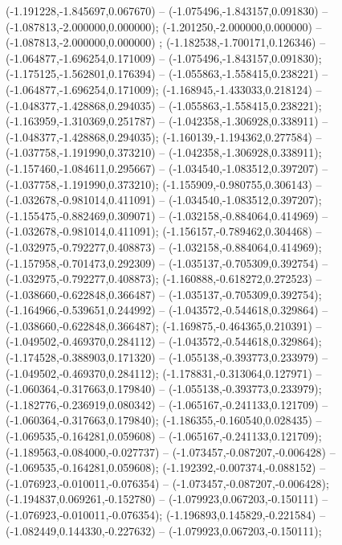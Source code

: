  (-1.191228,-1.845697,0.067670) -- (-1.075496,-1.843157,0.091830) -- (-1.087813,-2.000000,0.000000);
 (-1.201250,-2.000000,0.000000) -- (-1.087813,-2.000000,0.000000) ;
 (-1.182538,-1.700171,0.126346) -- (-1.064877,-1.696254,0.171009) -- (-1.075496,-1.843157,0.091830);
 (-1.175125,-1.562801,0.176394) -- (-1.055863,-1.558415,0.238221) -- (-1.064877,-1.696254,0.171009);
 (-1.168945,-1.433033,0.218124) -- (-1.048377,-1.428868,0.294035) -- (-1.055863,-1.558415,0.238221);
 (-1.163959,-1.310369,0.251787) -- (-1.042358,-1.306928,0.338911) -- (-1.048377,-1.428868,0.294035);
 (-1.160139,-1.194362,0.277584) -- (-1.037758,-1.191990,0.373210) -- (-1.042358,-1.306928,0.338911);
 (-1.157460,-1.084611,0.295667) -- (-1.034540,-1.083512,0.397207) -- (-1.037758,-1.191990,0.373210);
 (-1.155909,-0.980755,0.306143) -- (-1.032678,-0.981014,0.411091) -- (-1.034540,-1.083512,0.397207);
 (-1.155475,-0.882469,0.309071) -- (-1.032158,-0.884064,0.414969) -- (-1.032678,-0.981014,0.411091);
 (-1.156157,-0.789462,0.304468) -- (-1.032975,-0.792277,0.408873) -- (-1.032158,-0.884064,0.414969);
 (-1.157958,-0.701473,0.292309) -- (-1.035137,-0.705309,0.392754) -- (-1.032975,-0.792277,0.408873);
 (-1.160888,-0.618272,0.272523) -- (-1.038660,-0.622848,0.366487) -- (-1.035137,-0.705309,0.392754);
 (-1.164966,-0.539651,0.244992) -- (-1.043572,-0.544618,0.329864) -- (-1.038660,-0.622848,0.366487);
 (-1.169875,-0.464365,0.210391) -- (-1.049502,-0.469370,0.284112) -- (-1.043572,-0.544618,0.329864);
 (-1.174528,-0.388903,0.171320) -- (-1.055138,-0.393773,0.233979) -- (-1.049502,-0.469370,0.284112);
 (-1.178831,-0.313064,0.127971) -- (-1.060364,-0.317663,0.179840) -- (-1.055138,-0.393773,0.233979);
 (-1.182776,-0.236919,0.080342) -- (-1.065167,-0.241133,0.121709) -- (-1.060364,-0.317663,0.179840);
 (-1.186355,-0.160540,0.028435) -- (-1.069535,-0.164281,0.059608) -- (-1.065167,-0.241133,0.121709);
 (-1.189563,-0.084000,-0.027737) -- (-1.073457,-0.087207,-0.006428) -- (-1.069535,-0.164281,0.059608);
 (-1.192392,-0.007374,-0.088152) -- (-1.076923,-0.010011,-0.076354) -- (-1.073457,-0.087207,-0.006428);
 (-1.194837,0.069261,-0.152780) -- (-1.079923,0.067203,-0.150111) -- (-1.076923,-0.010011,-0.076354);
 (-1.196893,0.145829,-0.221584) -- (-1.082449,0.144330,-0.227632) -- (-1.079923,0.067203,-0.150111);
